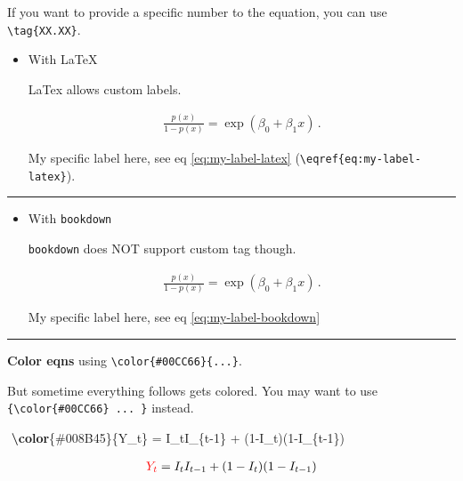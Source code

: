 \documentclass[
  a4paper,
  twoside,
  openright]{book}
\newenvironment{Shaded}{\begin{snugshade}}{\end{snugshade}}
\newcommand{\SpecialCharTok}[1]{\textcolor[rgb]{0.81,0.36,0.00}{\textbf{#1}}}
\newcommand{\SpecialStringTok}[1]{\textcolor[rgb]{0.31,0.60,0.02}{#1}}
\theoremstyle{definition}
\theoremstyle{definition}
\theoremstyle{definition}
\theoremstyle{definition}
\theoremstyle{remark}
\begin{document}
If you want to provide a specific number to the equation, you can use \texttt{\textbackslash{}tag\{XX.XX\}}.

\begin{itemize}
\item
  With LaTeX

  LaTex allows custom labels.

  \begin{align} \label{eq:my-label-latex} \tag{my label latex}
  \frac{p(x)}{1-p(x)} = \exp (\beta_0+\beta_1 x) \,.
  \end{align}

  My specific label here, see eq \eqref{eq:my-label-latex} (\texttt{\textbackslash{}eqref\{eq:my-label-latex\}}).
\end{itemize}

\begin{center}\rule{0.5\linewidth}{0.5pt}\end{center}

\begin{itemize}
\item
  With \texttt{bookdown}

  \texttt{bookdown} does NOT support custom tag though.

  \begin{align}
  \frac{p(x)}{1-p(x)} = \exp (\beta_0+\beta_1 x) \,.
  \label{eq:my-label-bookdown}
  \end{align}

  My specific label here, see eq \eqref{eq:my-label-bookdown}
\end{itemize}

\begin{center}\rule{0.5\linewidth}{0.5pt}\end{center}

\textbf{Color eqns} using \texttt{\textbackslash{}color\{\#00CC66\}\{...\}}.

But sometime everything follows gets colored. You may want to use \texttt{\{\textbackslash{}color\{\#00CC66\}\ ...\ \}} instead.

\begin{Shaded}
\begin{Highlighting}[]
\SpecialStringTok{$$}
\SpecialCharTok{\textbackslash{}color}\SpecialStringTok{\{\#008B45\}\{Y\_t\} = I\_tI\_\{t{-}1\} + (1{-}I\_t)(1{-}I\_\{t{-}1\})}
\SpecialStringTok{$$}
\end{Highlighting}
\end{Shaded}

\begin{align*}
{\color{red}Y_t} = I_tI_{t-1} + (1-I_t)(1-I_{t-1})
\end{align*}
\end{document}

